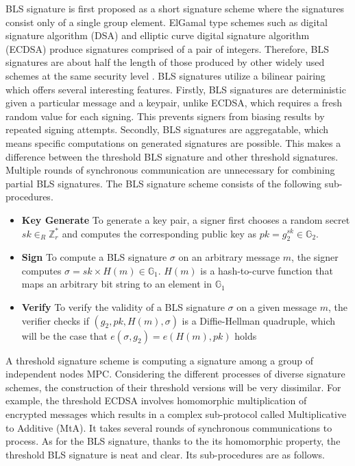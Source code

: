 \documentclass[11pt]{article}
\begin{document}
BLS signature is first proposed as a short signature scheme where the signatures consist only of a single group element. ElGamal type schemes such as digital signature algorithm (DSA) and elliptic curve digital signature algorithm (ECDSA) produce signatures comprised of a pair of integers. Therefore, BLS signatures are about half the length of those produced by other widely used schemes at the same security level \cite{menezes2009introduction}. BLS signatures utilize a bilinear pairing which offers several interesting features. Firstly, BLS signatures are deterministic given a particular message and a keypair, unlike ECDSA, which requires a fresh random value for each signing. This prevents signers from biasing results by repeated signing attempts. Secondly, BLS signatures are aggregatable, which means specific computations on generated signatures are possible. This makes a difference between the threshold BLS signature and other threshold signatures. Multiple rounds of synchronous communication are unnecessary for combining partial BLS signatures. The BLS signature scheme consists of the following sub-procedures.

\begin{itemize}
    \item[] \textbf{Key Generate} To generate a key pair, a signer first chooses a random secret $sk \in_R \mathbb{Z}_r^*$ and computes the corresponding public key as $pk = g_2^{sk} \in \mathbb{G}_2$.
    \item[] \textbf{Sign} To compute a BLS signature $\sigma$ on an arbitrary message $m$, the signer computes $\sigma = sk \times H(m) \in \mathbb{G}_1$. $H(m)$ is a hash-to-curve function that maps an arbitrary bit string to an element in $\mathbb{G}_1$
    \item[] \textbf{Verify} To verify the validity of a BLS signature $\sigma$ on a given message $m$, the verifier checks if $(g_2,pk,H(m),\sigma)$ is a Diffie-Hellman quadruple, which will be the case that $e(\sigma,g_2)=e(H(m),pk)$ holds
\end{itemize}

A threshold signature scheme is computing a signature among a group of independent nodes MPC. Considering the different processes of diverse signature schemes, the construction of their threshold versions will be very dissimilar. For example, the threshold ECDSA involves homomorphic multiplication of encrypted messages which results in a complex sub-protocol called Multiplicative to Additive (MtA). It takes several rounds of synchronous communications to process. As for the BLS signature, thanks to the its homomorphic property, the threshold BLS signature is neat and clear. Its sub-procedures are as follows.
\end{document}
